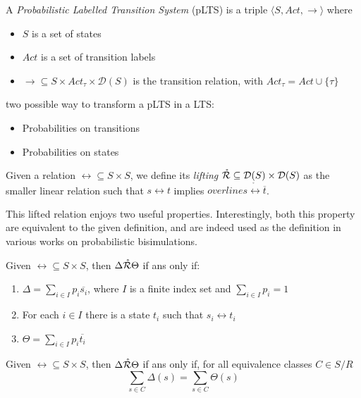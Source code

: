 A \textit{Probabilistic Labelled Transition System} (pLTS) is a triple $\langle S , Act, \rightarrow \rangle$ where \begin{itemize}
\item $S$ is a set of states
\item $Act$ is a set of transition labels
\item $\rightarrow 	\subseteq S\times Act_\tau \times \mathcal{D}(S)$ is the transition relation, with $Act_\tau = Act \cup \{\tau\}$
\end{itemize} 

two possible way to transform a pLTS in a LTS: \begin{itemize}
\item Probabilities on transitions
\item Probabilities on states
\end{itemize}


Given a relation $\rel \subseteq S \times S$, we define its \textit{lifting} $\mathring{\mathcal{R}} \subseteq \mathcal{D}(S) \times \mathcal{D}(S)$ as the smaller linear relation such that $s \rel t$ implies $overline{s} \mathring{\rel} \overline{t}$.



This lifted relation enjoys two useful properties. Interestingly, both this property are equivalent to the given definition, and are indeed used as the definition in various works on probabilistic bisimulations.

Given $\rel \subseteq S \times S$, then $\Delta \mathring{\mathcal{R}} \Theta$ if ans only if: \begin{enumerate}
\item $\Delta = \sum_{i \in I} p_i \overline{s_i}$, where $I$ is a finite index set and $\sum_{i \in I}p_i = 1$
\item For each $i \in I$ there is a state $t_i$ such that $s_i \rel t_i$
\item $\Theta = \sum_{i\in I}p_i\overline{t_i}$ 
\end{enumerate}

Given $\rel \subseteq S \times S$, then $\Delta \mathring{\mathcal{R}} \Theta$ if ans only if, for all equivalence classes $C \in S/R$
\[\sum_{s\in C} \Delta(s) = \sum_{s\in C} \Theta(s)\]


